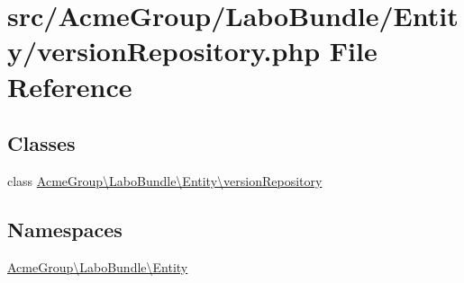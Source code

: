 \hypertarget{version_repository_8php}{\section{src/\+Acme\+Group/\+Labo\+Bundle/\+Entity/version\+Repository.php File Reference}
\label{version_repository_8php}
}
\subsection*{Classes}
\begin{DoxyCompactItemize}
\item 
class \hyperlink{class_acme_group_1_1_labo_bundle_1_1_entity_1_1version_repository}{Acme\+Group\textbackslash{}\+Labo\+Bundle\textbackslash{}\+Entity\textbackslash{}version\+Repository}
\end{DoxyCompactItemize}
\subsection*{Namespaces}
\begin{DoxyCompactItemize}
\item 
 \hyperlink{namespace_acme_group_1_1_labo_bundle_1_1_entity}{Acme\+Group\textbackslash{}\+Labo\+Bundle\textbackslash{}\+Entity}
\end{DoxyCompactItemize}
